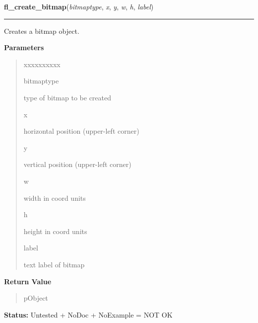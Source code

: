     \label{xformslib:library:fl_create_bitmap}

    \vspace{0.5ex}

\hspace{.8\funcindent}\begin{boxedminipage}{\funcwidth}

    \raggedright \textbf{fl\_create\_bitmap}(\textit{bitmaptype}, \textit{x}, \textit{y}, \textit{w}, \textit{h}, \textit{label})

    \vspace{-1.5ex}

    \rule{\textwidth}{0.5\fboxrule}
\setlength{\parskip}{2ex}
    Creates a bitmap object.

\setlength{\parskip}{1ex}
      \textbf{Parameters}
      \vspace{-1ex}

      \begin{quote}
        \begin{Ventry}{xxxxxxxxxx}

          \item[bitmaptype]

          type of bitmap to be created

          \item[x]

          horizontal position (upper-left corner)

          \item[y]

          vertical position (upper-left corner)

          \item[w]

          width in coord units

          \item[h]

          height in coord units

          \item[label]

          text label of bitmap

        \end{Ventry}

      \end{quote}

      \textbf{Return Value}
    \vspace{-1ex}

      \begin{quote}
      pObject

      \end{quote}

\textbf{Status:} Untested + NoDoc + NoExample = NOT OK



    \end{boxedminipage}

